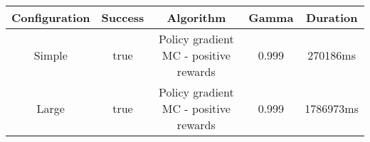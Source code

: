 \begin{tabular}{|c|c|c|c|c|}
\hline
Configuration & Success & Algorithm & Gamma & Duration\\
\hline
Simple & true & Policy gradient MC - positive rewards & 0.999 & 270186ms\\
Large & true & Policy gradient MC - positive rewards & 0.999 & 1786973ms\\
\hline
\end{tabular}